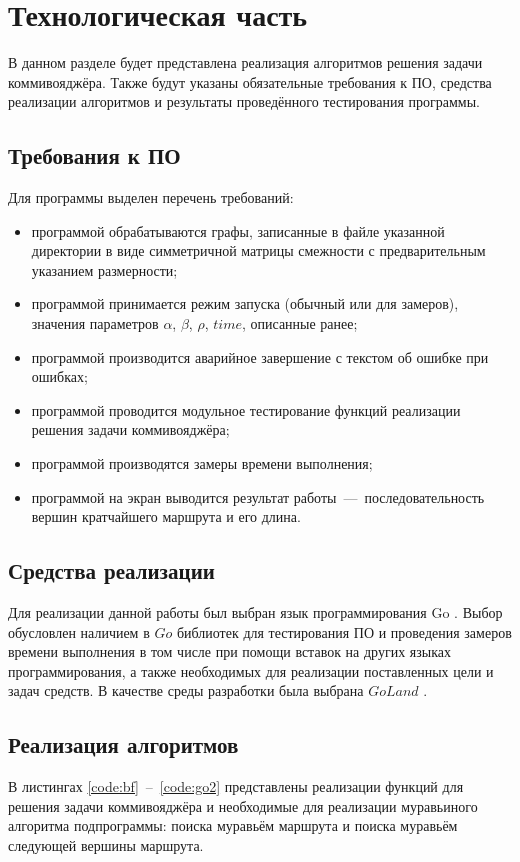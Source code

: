\chapter{Технологическая часть}

В данном разделе будет представлена реализация алгоритмов решения задачи коммивояджёра. Также будут указаны обязательные требования к ПО, средства реализации алгоритмов и результаты проведённого тестирования программы.

\section{Требования к ПО}
Для программы выделен перечень требований:
\begin{itemize}
	\item программой обрабатываются графы, записанные в файле указанной директории в виде симметричной матрицы смежности с предварительным указанием размерности;
	\item программой принимается режим запуска (обычный или для замеров), значения параметров $\alpha$, $\beta$, $\rho$, $time$, описанные ранее;
	\item программой производится аварийное завершение с текстом об ошибке при ошибках;
	\item программой проводится модульное тестирование функций реализации решения задачи коммивояджёра;
	\item программой производятся замеры времени выполнения;
	\item программой на экран выводится результат работы~---~последовательность вершин кратчайшего маршрута и его длина.
\end{itemize}

\section{Средства реализации}
Для реализации данной работы был выбран язык программирования Go \cite{item1}. Выбор обусловлен наличием в $Go$ библиотек для тестирования ПО и проведения замеров времени выполнения в том числе при помощи вставок на других языках программирования, а также необходимых для реализации поставленных цели и задач средств. В качестве среды разработки была выбрана $GoLand$ \cite{item3}.

\section{Реализация алгоритмов}
В листингах \ref{code:bf}~--~\ref{code:go2} представлены реализации функций для решения задачи коммивояджёра и необходимые для реализации муравьиного алгоритма подпрограммы: поиска муравьём маршрута и поиска муравьём следующей вершины маршрута. 

